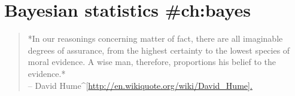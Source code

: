 
\chapter{Bayesian statistics {#ch:bayes}}

\begin{quote}
*In our reasonings concerning matter of fact, there are all imaginable degrees of assurance, from the highest certainty to the lowest species of moral evidence. A wise man, therefore, proportions his belief to the evidence.* \\
\hspace*{2cm} -- David Hume^[\url{http://en.wikiquote.org/wiki/David_Hume].}
\end{quote}


%
%




